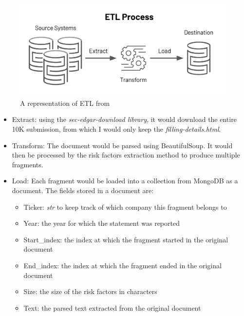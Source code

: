 \documentclass[12pt,MSc,a4paper,oneside]{muthesis}
\begin{document}
  \begin{figure}[h]
    \centering
    \includegraphics[scale=0.3]{images/abstract/ETL-Process.jpeg}
    \caption{A representation of ETL from \cite{etl}}
  \end{figure}

  \begin{itemize}
    \item Extract: using the \textit{sec-edgar-download library}, it would download the entire 10K submission, from which I would only keep the \textit{filling-details.html}.
    \item Transform: The document would be parsed using BeautifulSoup. It would then be processed by the risk factors extraction method to produce multiple fragments.
    \item Load: Each fragment would be loaded into a collection from MongoDB as a document. The fields stored in a document are:
      \begin{itemize}
        \item Ticker: \textit{str} to keep track of which company this fragment belongs to
        \item Year: the year for which the statement was reported
        \item Start\_index: the index at which the fragment started in the original document
        \item End\_index: the index at which the fragment ended in the original document
        \item Size: the size of the risk factors in characters
        \item Text: the parsed text extracted from the original document
      \end{itemize}
  \end{itemize}
\end{document}
